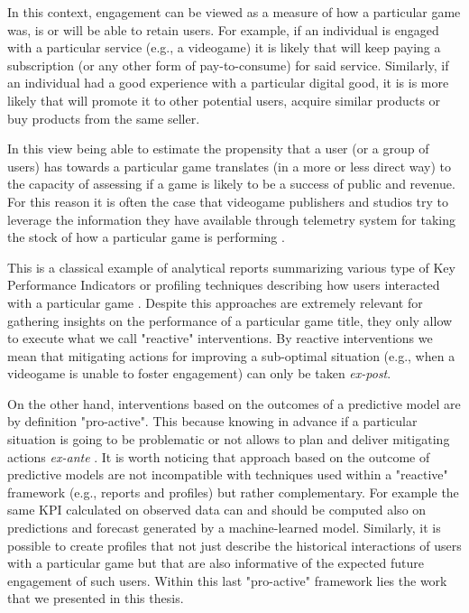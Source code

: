 In this context, engagement can be viewed as a measure of how a particular game was, is or will be able to retain users. For example, if an individual is engaged with a particular service (e.g., a videogame) it is likely that will keep paying a subscription (or any other form of pay-to-consume) for said service. Similarly, if an individual had a good experience with a particular digital good, it is is more likely that will promote it to other potential users, acquire similar products or buy products from the same seller.  

In this view being able to estimate the propensity that a user (or a group of users) has towards a particular game translates (in a more or less direct way) to the capacity of assessing if a game is likely to be a success of public and revenue. For this reason it is often the case that videogame publishers and studios try to leverage the information they have available through telemetry system for taking the stock of how a particular game is performing \cite{el2016game}. 

This is a classical example of analytical reports summarizing various type of Key Performance Indicators \cite{el2016game} or profiling techniques describing how users interacted with a particular game \cite{el2016game}. Despite this approaches are extremely relevant for gathering insights on the performance of a particular game title, they only allow to execute what we call "reactive" interventions. By reactive interventions we mean that mitigating actions for improving a sub-optimal situation (e.g., when a videogame is unable to foster engagement) can only be taken \textit{ex-post}.

On the other hand, interventions based on the outcomes of a predictive model are by definition "pro-active". This because knowing in advance if a particular situation is going to be problematic or not allows to plan and deliver mitigating actions \textit{ex-ante} \cite{el2016game, el2021game}. It is worth noticing that approach based on the outcome of predictive models are not incompatible with techniques used within a "reactive" framework (e.g., reports and profiles) but rather complementary. For example the same KPI calculated on observed data can and should be computed also on predictions and forecast generated by a machine-learned model. Similarly, it is possible to create profiles that not just describe the historical interactions of users with a particular game but that are also informative of the expected future engagement of such users. Within this last "pro-active" framework lies the work that we presented in this thesis. 

